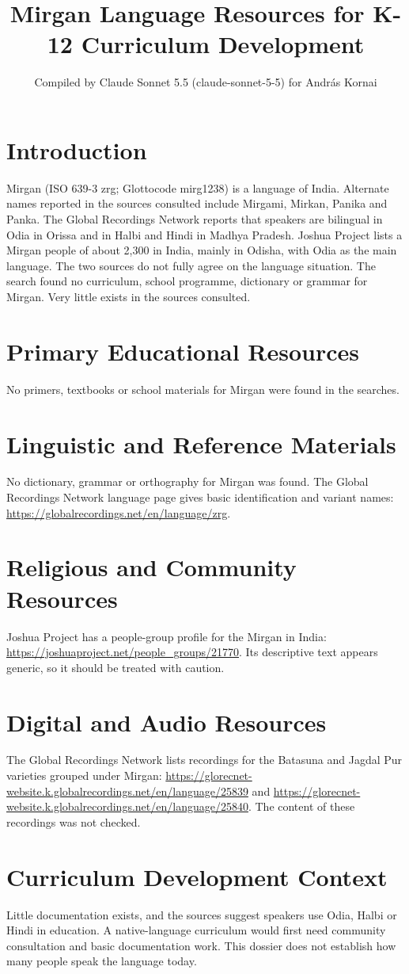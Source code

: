 \documentclass[12pt]{article}
\title{Mirgan Language Resources for K-12 Curriculum Development}
\author{Compiled by Claude Sonnet 5.5 (claude-sonnet-5-5) for Andr\'as Kornai}
\date{}
\begin{document}
\maketitle

\section{Introduction}
Mirgan (ISO 639-3 zrg; Glottocode mirg1238) is a language of India. Alternate names reported in the sources consulted include Mirgami, Mirkan, Panika and Panka. The Global Recordings Network reports that speakers are bilingual in Odia in Orissa and in Halbi and Hindi in Madhya Pradesh. Joshua Project lists a Mirgan people of about 2,300 in India, mainly in Odisha, with Odia as the main language. The two sources do not fully agree on the language situation. The search found no curriculum, school programme, dictionary or grammar for Mirgan. Very little exists in the sources consulted.

\section{Primary Educational Resources}
No primers, textbooks or school materials for Mirgan were found in the searches.

\section{Linguistic and Reference Materials}
No dictionary, grammar or orthography for Mirgan was found. The Global Recordings Network language page gives basic identification and variant names: \url{https://globalrecordings.net/en/language/zrg}.

\section{Religious and Community Resources}
Joshua Project has a people-group profile for the Mirgan in India: \url{https://joshuaproject.net/people_groups/21770}. Its descriptive text appears generic, so it should be treated with caution.

\section{Digital and Audio Resources}
The Global Recordings Network lists recordings for the Batasuna and Jagdal Pur varieties grouped under Mirgan: \url{https://glorecnet-website.k.globalrecordings.net/en/language/25839} and \url{https://glorecnet-website.k.globalrecordings.net/en/language/25840}. The content of these recordings was not checked.

\section{Curriculum Development Context}
Little documentation exists, and the sources suggest speakers use Odia, Halbi or Hindi in education. A native-language curriculum would first need community consultation and basic documentation work. This dossier does not establish how many people speak the language today.
\end{document}
